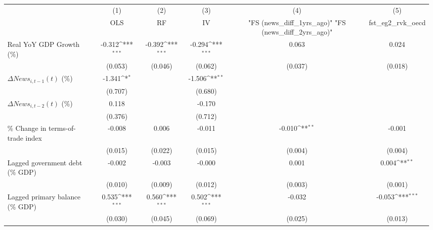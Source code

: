 {
\def\sym#1{\ifmmode^{#1}\else\(^{#1}\)\fi}
\begin{tabular}{l*{5}{c}}
\toprule
                    &\multicolumn{1}{c}{(1)}&\multicolumn{1}{c}{(2)}&\multicolumn{1}{c}{(3)}&\multicolumn{1}{c}{(4)}&\multicolumn{1}{c}{(5)}\\
                    &\multicolumn{1}{c}{OLS}&\multicolumn{1}{c}{RF}&\multicolumn{1}{c}{IV}&\multicolumn{1}{c}{ "FS (news_diff_1yrs_ago)"  "FS (news_diff_2yrs_ago)" }&\multicolumn{1}{c}{fst_eg2_rvk_oecd}\\
\midrule
Real YoY GDP Growth (\%)&      -0.312\sym{***}&      -0.392\sym{***}&      -0.294\sym{***}&       0.063         &       0.024         \\
                    &     (0.053)         &     (0.046)         &     (0.062)         &     (0.037)         &     (0.018)         \\
\addlinespace
$ \Delta News_{i,t-1}(t)$ (\%)&      -1.341\sym{*}  &                     &      -1.506\sym{**} &                     &                     \\
                    &     (0.707)         &                     &     (0.680)         &                     &                     \\
\addlinespace
$ \Delta News_{i,t-2}(t)$ (\%)&       0.118         &                     &      -0.170         &                     &                     \\
                    &     (0.376)         &                     &     (0.712)         &                     &                     \\
\addlinespace
\% Change in terms-of-trade index&      -0.008         &       0.006         &      -0.011         &      -0.010\sym{**} &      -0.001         \\
                    &     (0.015)         &     (0.022)         &     (0.015)         &     (0.004)         &     (0.004)         \\
\addlinespace
Lagged government debt (\% GDP)&      -0.002         &      -0.003         &      -0.000         &       0.001         &       0.004\sym{**} \\
                    &     (0.010)         &     (0.009)         &     (0.012)         &     (0.003)         &     (0.001)         \\
\addlinespace
Lagged primary balance (\% GDP)&       0.535\sym{***}&       0.560\sym{***}&       0.502\sym{***}&      -0.032         &      -0.053\sym{***}\\
                    &     (0.030)         &     (0.045)         &     (0.069)         &     (0.025)         &     (0.013)         \\

\end{tabular}}
